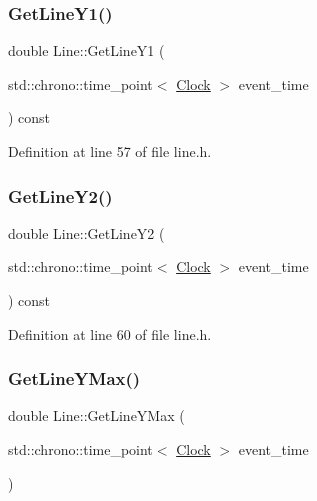 \subsubsection{\texorpdfstring{Get\+Line\+Y1()}{GetLineY1()}}
{\footnotesize\ttfamily double Line\+::\+Get\+Line\+Y1 (\begin{DoxyParamCaption}\item[{std\+::chrono\+::time\+\_\+point$<$ \mbox{\hyperlink{universe_8h_a0ef8d951d1ca5ab3cfaf7ab4c7a6fd80}{Clock}} $>$}]{event\+\_\+time }\end{DoxyParamCaption}) const\hspace{0.3cm}{\ttfamily [inline]}}



Definition at line 57 of file line.\+h.

\mbox{\label{class_line_a6222d15f883f3183ec9eed085046916a}} 
\subsubsection{\texorpdfstring{Get\+Line\+Y2()}{GetLineY2()}}
{\footnotesize\ttfamily double Line\+::\+Get\+Line\+Y2 (\begin{DoxyParamCaption}\item[{std\+::chrono\+::time\+\_\+point$<$ \mbox{\hyperlink{universe_8h_a0ef8d951d1ca5ab3cfaf7ab4c7a6fd80}{Clock}} $>$}]{event\+\_\+time }\end{DoxyParamCaption}) const\hspace{0.3cm}{\ttfamily [inline]}}



Definition at line 60 of file line.\+h.

\mbox{\label{class_line_ab033cff3a24b67be829759d16f13c281}} 
\subsubsection{\texorpdfstring{Get\+Line\+Y\+Max()}{GetLineYMax()}}
{\footnotesize\ttfamily double Line\+::\+Get\+Line\+Y\+Max (\begin{DoxyParamCaption}\item[{std\+::chrono\+::time\+\_\+point$<$ \mbox{\hyperlink{universe_8h_a0ef8d951d1ca5ab3cfaf7ab4c7a6fd80}{Clock}} $>$}]{event\+\_\+time }\end{DoxyParamCaption})\hspace{0.3cm}{\ttfamily [inline]}}



